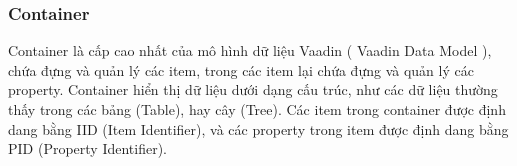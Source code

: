\subsubsection{Container}
Container là cấp cao nhất của mô hình dữ liệu Vaadin ( Vaadin Data Model ), chứa đựng và quản lý các item, trong các item lại chứa đựng và quản lý các property. Container hiển thị dữ liệu dưới dạng cấu trúc, như các dữ liệu thường thấy trong các bảng (Table), hay cây (Tree). Các item trong container được định dang bằng IID (Item Identifier), và các property trong item được định dang bằng PID (Property Identifier).